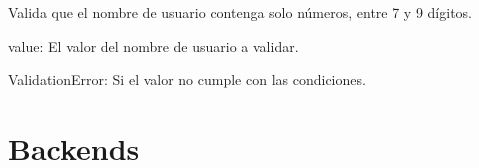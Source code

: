 \documentclass[letterpaper,10pt,spanish]{sphinxmanual}
\begin{document}
\begin{fulllineitems}

\pysigstartsignatures
{}
\pysigstopsignatures
\sphinxAtStartPar
Valida que el nombre de usuario contenga solo números, entre 7 y 9 dígitos.
\begin{description}
\sphinxAtStartPar
value: El valor del nombre de usuario a validar.

\sphinxAtStartPar
ValidationError: Si el valor no cumple con las condiciones.

\end{description}

\end{fulllineitems}



\section{Backends}
\label{\detokenize{usuarios:backends}}
\end{document}
